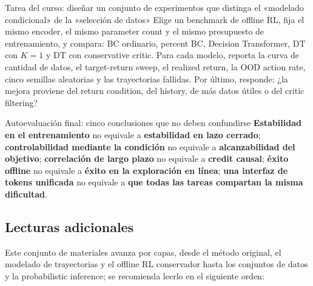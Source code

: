 \begin{importantbox}{Tarea del curso: diseñar un conjunto de experimentos que distinga el «modelado condicional» de la «selección de datos»}
Elige un benchmark de offline RL, fija el mismo encoder, el mismo parameter count y el mismo presupuesto de entrenamiento, y compara: BC ordinario, percent BC, Decision Transformer, DT con $K=1$ y DT con conservative critic. Para cada modelo, reporta la curva de cantidad de datos, el target-return sweep, el realized return, la OOD action rate, cinco semillas aleatorias y las trayectorias fallidas. Por último, responde: ¿la mejora proviene del return condition, del history, de más datos útiles o del critic filtering?
\end{importantbox}

\begin{warningbox}{Autoevaluación final: cinco conclusiones que no deben confundirse}
\textbf{Estabilidad en el entrenamiento} no equivale a \textbf{estabilidad en lazo cerrado}; \textbf{controlabilidad mediante la condición} no equivale a \textbf{alcanzabilidad del objetivo}; \textbf{correlación de largo plazo} no equivale a \textbf{credit causal}; \textbf{éxito offline} no equivale a \textbf{éxito en la exploración en línea}; \textbf{una interfaz de tokens unificada} no equivale a \textbf{que todas las tareas compartan la misma dificultad}.
\end{warningbox}

\subsection{Lecturas adicionales}

Este conjunto de materiales avanza por capas, desde el método original, el modelado de trayectorias y el offline RL conservador hasta los conjuntos de datos y la probabilistic inference; se recomienda leerlo en el siguiente orden:

